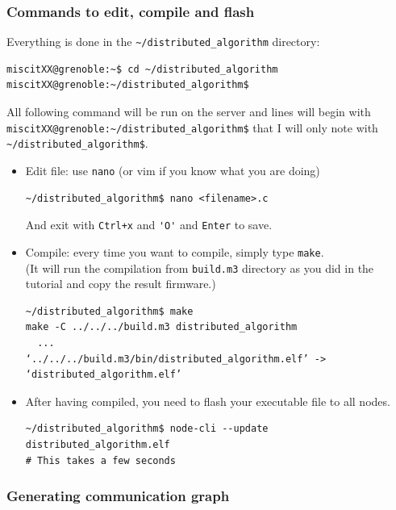 \documentclass{article}
\begin{document}
\subsubsection{Commands to edit, compile and flash} \label{subsect:edit-compile-flash}

Everything is done in the \verb=~/distributed_algorithm= directory:
\begin{verbatim}
miscitXX@grenoble:~$ cd ~/distributed_algorithm
miscitXX@grenoble:~/distributed_algorithm$
\end{verbatim}

All following command will be run on the server and lines will begin with\\
\verb=miscitXX@grenoble:~/distributed_algorithm$= that I will only note with
\verb=~/distributed_algorithm$=.


\begin{itemize}

\item Edit file: use \verb=nano= (or vim if you know what you are doing)
    \begin{verbatim}~/distributed_algorithm$ nano <filename>.c\end{verbatim}
    And exit with \verb=Ctrl+x= and \verb='O'= and \verb=Enter= to save.

\item Compile: every time you want to compile, simply type \verb=make=.\\
    (It will run the compilation from \verb=build.m3= directory as you did in the tutorial and copy the result firmware.)
    \begin{verbatim}~/distributed_algorithm$ make
make -C ../../../build.m3 distributed_algorithm
  ...
‘../../../build.m3/bin/distributed_algorithm.elf’ -> ‘distributed_algorithm.elf’
\end{verbatim}

\item After having compiled, you need to flash your executable file to all nodes.
    \begin{verbatim}~/distributed_algorithm$ node-cli --update distributed_algorithm.elf
# This takes a few seconds
\end{verbatim}

\end{itemize}


\subsubsection{Generating communication graph}
\end{document}

